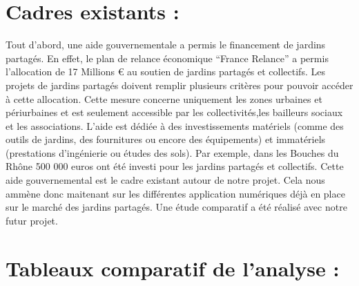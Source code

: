 \documentclass{report}
\begin{document}
\section{Cadres existants :}

Tout d'abord, une aide gouvernementale a permis le financement de jardins partagés. En effet, le plan de relance économique “France Relance” a permis l’allocation de 17 Millions € au soutien de jardins partagés et collectifs. Les projets de jardins partagés doivent remplir plusieurs critères pour pouvoir accéder à cette allocation. Cette mesure concerne uniquement les zones urbaines et périurbaines et est seulement accessible par les collectivités,les bailleurs sociaux et les associations. L’aide est dédiée à des investissements matériels (comme des outils de jardins, des fournitures ou encore des équipements) et immatériels (prestations d'ingénierie ou études des sols). Par exemple, dans les Bouches du Rhône 500 000 euros ont été investi pour les jardins partagés et collectifs. Cette aide gouvernemental est le cadre existant autour de notre projet. Cela nous ammène donc maitenant sur les différentes application numériques déjà en place sur le marché des jardins partagés. Une étude comparatif a été réalisé avec notre futur projet. 


\section{Tableaux comparatif de l'analyse :}
\end{document}
